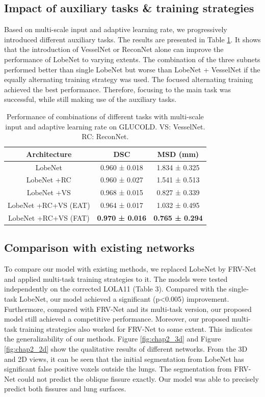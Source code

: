 \subsection{Impact of auxiliary tasks \& training strategies}
Based on multi-scale input and adaptive learning rate, we progressively introduced different auxiliary tasks. The results are presented in Table \ref{chap2_tb2}. It shows that the introduction of VesselNet or ReconNet alone can improve the performance of LobeNet to varying extents. The combination of the three subnets performed better than single LobeNet but worse than LobeNet + VesselNet if the equally alternating training strategy was used. The focused alternating training achieved the best performance. Therefore, focusing to the main task was successful, while still making use of the auxiliary tasks. 

\begin{table}[tb]
    \centering
    \caption{Performance of combinations of different tasks with multi-scale input and adaptive learning rate on GLUCOLD. VS: VesselNet. RC: ReconNet. }
    \begin{tabular}{ccc}
    \hline
        \textbf{Architecture} & \textbf{DSC} & \textbf{MSD (mm) } \\ \hline
        LobeNet & 0.960 ± 0.018 & 1.834 ± 0.325  \\ 
        LobeNet +RC & 0.960 ± 0.027 & 1.541 ± 0.513  \\ 
        LobeNet +VS & 0.968 ± 0.015 & 0.827 ± 0.339  \\ 
        LobeNet +RC+VS (EAT) & 0.964 ± 0.017 & 1.032 ± 0.495  \\ 
        LobeNet +RC+VS (FAT) & \textbf{0.970 ± 0.016} & \textbf{0.765 ± 0.294}  \\ \hline
    \end{tabular}
    \label{chap2_tb2}
\end{table}

\subsection{Comparison with existing networks}
To compare our model with existing methods, we replaced LobeNet by FRV-Net \cite{ferreira2018end} and applied multi-task training strategies to it. The models were tested independently on the corrected LOLA11 (Table 3). Compared with the single-task LobeNet, our model achieved a significant (p<0.005) improvement. Furthermore, compared with FRV-Net and its multi-task version, our proposed model still achieved a competitive performance. Moreover, our proposed multi-task training strategies also worked for FRV-Net to some extent. This indicates the generalizability of our methods.
Figure \ref{fig:chap2_3d} and Figure \ref{fig:chap2_2d} show the qualitative results of different networks. From the 3D and 2D views, it can be seen that the initial segmentation from LobeNet has significant false positive voxels outside the lungs. The segmentation from FRV-Net could not predict the oblique fissure exactly. Our model was able to precisely predict both fissures and lung surfaces. 

